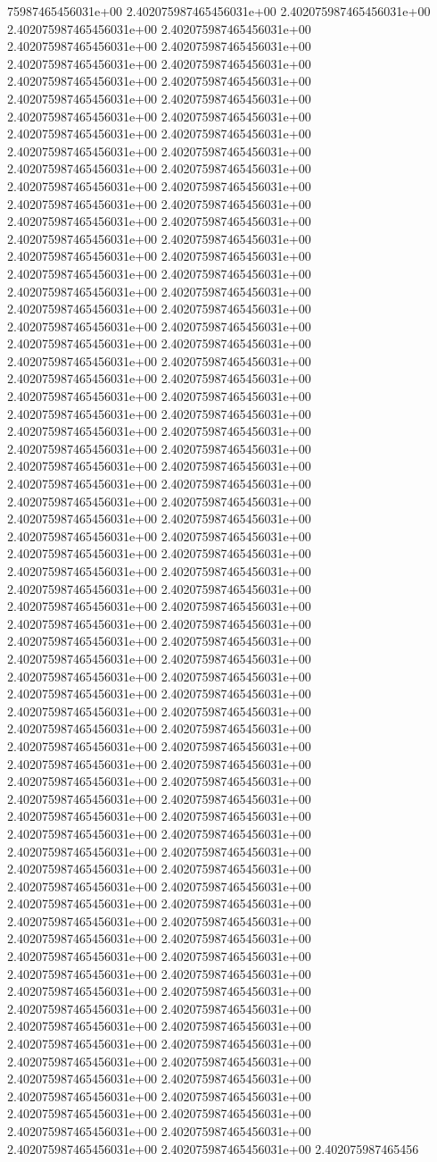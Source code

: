 75987465456031e+00	2.402075987465456031e+00	2.402075987465456031e+00	2.402075987465456031e+00	2.402075987465456031e+00	2.402075987465456031e+00	2.402075987465456031e+00	2.402075987465456031e+00	2.402075987465456031e+00	2.402075987465456031e+00	2.402075987465456031e+00	2.402075987465456031e+00	2.402075987465456031e+00	2.402075987465456031e+00	2.402075987465456031e+00	2.402075987465456031e+00	2.402075987465456031e+00	2.402075987465456031e+00	2.402075987465456031e+00	2.402075987465456031e+00	2.402075987465456031e+00	2.402075987465456031e+00	2.402075987465456031e+00	2.402075987465456031e+00	2.402075987465456031e+00	2.402075987465456031e+00	2.402075987465456031e+00	2.402075987465456031e+00	2.402075987465456031e+00	2.402075987465456031e+00	2.402075987465456031e+00	2.402075987465456031e+00	2.402075987465456031e+00	2.402075987465456031e+00	2.402075987465456031e+00	2.402075987465456031e+00	2.402075987465456031e+00	2.402075987465456031e+00	2.402075987465456031e+00	2.402075987465456031e+00	2.402075987465456031e+00	2.402075987465456031e+00	2.402075987465456031e+00	2.402075987465456031e+00	2.402075987465456031e+00	2.402075987465456031e+00	2.402075987465456031e+00	2.402075987465456031e+00	2.402075987465456031e+00	2.402075987465456031e+00	2.402075987465456031e+00	2.402075987465456031e+00	2.402075987465456031e+00	2.402075987465456031e+00	2.402075987465456031e+00	2.402075987465456031e+00	2.402075987465456031e+00	2.402075987465456031e+00	2.402075987465456031e+00	2.402075987465456031e+00	2.402075987465456031e+00	2.402075987465456031e+00	2.402075987465456031e+00	2.402075987465456031e+00	2.402075987465456031e+00	2.402075987465456031e+00	2.402075987465456031e+00	2.402075987465456031e+00	2.402075987465456031e+00	2.402075987465456031e+00	2.402075987465456031e+00	2.402075987465456031e+00	2.402075987465456031e+00	2.402075987465456031e+00	2.402075987465456031e+00	2.402075987465456031e+00	2.402075987465456031e+00	2.402075987465456031e+00	2.402075987465456031e+00	2.402075987465456031e+00	2.402075987465456031e+00	2.402075987465456031e+00	2.402075987465456031e+00	2.402075987465456031e+00	2.402075987465456031e+00	2.402075987465456031e+00	2.402075987465456031e+00	2.402075987465456031e+00	2.402075987465456031e+00	2.402075987465456031e+00	2.402075987465456031e+00	2.402075987465456031e+00	2.402075987465456031e+00	2.402075987465456031e+00	2.402075987465456031e+00	2.402075987465456031e+00	2.402075987465456031e+00	2.402075987465456031e+00	2.402075987465456031e+00	2.402075987465456031e+00	2.402075987465456031e+00	2.402075987465456031e+00	2.402075987465456031e+00	2.402075987465456031e+00	2.402075987465456031e+00	2.402075987465456031e+00	2.402075987465456031e+00	2.402075987465456031e+00	2.402075987465456031e+00	2.402075987465456031e+00	2.402075987465456031e+00	2.402075987465456031e+00	2.402075987465456031e+00	2.402075987465456031e+00	2.402075987465456031e+00	2.402075987465456031e+00	2.402075987465456031e+00	2.402075987465456031e+00	2.402075987465456031e+00	2.402075987465456031e+00	2.402075987465456031e+00	2.402075987465456031e+00	2.402075987465456031e+00	2.402075987465456031e+00	2.402075987465456031e+00	2.402075987465456031e+00	2.402075987465456031e+00	2.402075987465456031e+00	2.402075987465456031e+00	2.402075987465456031e+00	2.402075987465456031e+00	2.402075987465456031e+00	2.402075987465456031e+00	2.402075987465456